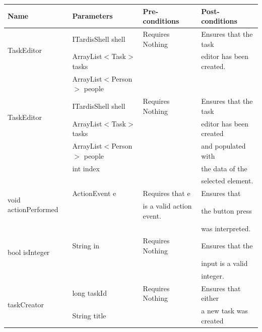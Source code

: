 \begin{tabular}{| l | l | l | l |}
\hline
Name & Parameters & Pre-conditions & Post-conditions\\
\hline
\multirow{2}{*}{TaskEditor} & ITardisShell shell                         & Requires Nothing & Ensures that the task\\ 
			          & ArrayList$<$Task$>$ tasks       &                             & editor has been created.\\ 
                                              & ArrayList$<$Person$>$ people &                             & 
\\
\hline
\multirow{2}{*}{TaskEditor} & ITardisShell shell                         & Requires Nothing & Ensures that the task\\ 
			          & ArrayList$<$Task$>$ tasks       &                             & editor has been created\\ 
                                              & ArrayList$<$Person$>$ people &                             & and populated with\\
			          & int index                                      &                            & the data of the\\
			          &                                                     &                            & selected element.
\\
\hline
\multirow{2}{*}{void actionPerformed} & ActionEvent e & Requires that e            & Ensures that\\
                                                        &                        & is a valid action event. & the button press\\
                                                        &                        &                                      & was interpreted.
\\
\hline
\multirow{2}{*}{bool isInteger} & String in & Requires Nothing & Ensures that the\\
		 	                &               &                             & input is a valid\\
		 	                &               &                             & integer.
\\
\hline
\multirow{2}{*}{taskCreator} & long taskId                    & Requires Nothing & Ensures that either\\
		 	             & String title                     &                             & a new task was created\\

\end{tabular}
